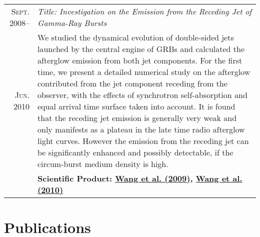 \documentclass[letterpaper,10pt]{article}
\begin{document}
\begin{longtable}{r|p{5.6in}}
  \textsc{Sept. 2008}--  &   \emph{Title: Investigation on the Emission from the Receding Jet of Gamma-Ray
  Bursts}   \\
  \textsc{Jun. 2010}    &   \small{We studied the dynamical evolution of double-sided jets launched by the
  central engine of GRBs and calculated the afterglow emission from both jet components. For the first time,
  we present a detailed numerical study on the afterglow contributed from the jet component receding from the
  observer, with the effects of synchrotron self-absorption and equal arrival time surface taken into account.
  It is found that the receding jet emission is generally very weak and only manifests as a plateau in the
  late time radio afterglow light curves. However the emission from the receding jet can be significantly
  enhanced and possibly detectable, if the circum-burst medium density is high.} \\
  &   \textbf{Scientific Product:
        \hyperlink{09.wang.aa}{Wang et al. (2009)},
        \hyperlink{10.wang.scichina}{Wang et al. (2010)}} \\

\end{longtable}

\vspace{-1em}
\section{Publications}
\vspace{-.8em}
\end{document}
